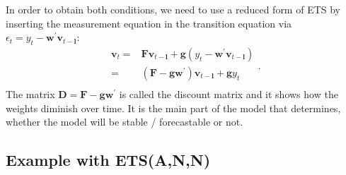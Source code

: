 \documentclass[
]{book}
\theoremstyle{definition}
\theoremstyle{definition}
\theoremstyle{definition}
\theoremstyle{definition}
\theoremstyle{remark}
\begin{document}
In order to obtain both conditions, we need to use a reduced form of ETS by inserting the measurement equation in the transition equation via \(\epsilon_t= {y}_{t} - \mathbf{w}^\prime \mathbf{v}_{t-\boldsymbol{l}}\):
\begin{equation}
  \begin{aligned}
    \mathbf{v}_{t} = &\mathbf{F} \mathbf{v}_{t-\boldsymbol{l}} + \mathbf{g} \left({y}_{t} - \mathbf{w}^\prime \mathbf{v}_{t-\boldsymbol{l}} \right)\\
    = & \left(\mathbf{F} - \mathbf{g}\mathbf{w}^\prime \right) \mathbf{v}_{t-\boldsymbol{l}} + \mathbf{g} {y}_{t} \\
  \end{aligned}.
  \label{eq:ETSADAMStateSpacePureAdditiveBackRecursion01}
\end{equation}
The matrix \(\mathbf{D}=\mathbf{F} - \mathbf{g}\mathbf{w}^\prime\) is called the discount matrix and it shows how the weights diminish over time. It is the main part of the model that determines, whether the model will be stable / forecastable or not.

\hypertarget{example-with-etsann-1}{%
\subsection{Example with ETS(A,N,N)}\label{example-with-etsann-1}}
\end{document}
